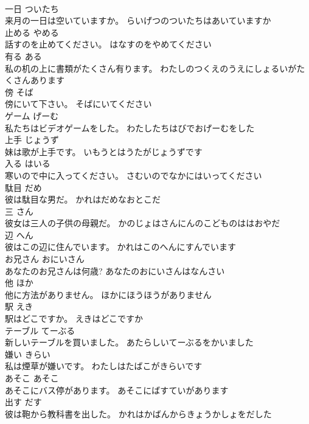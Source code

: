 \documentclass[8pt]{extreport}
\begin{document}
\begin{CJK}{UTF8}{min}
\\	一日	ついたち	
\\	来月の一日は空いていますか。	らいげつのついたちはあいていますか	
\\	止める	やめる	
\\	話すのを止めてください。	はなすのをやめてください	
\\	有る	ある	
\\	私の机の上に書類がたくさん有ります。	わたしのつくえのうえにしょるいがたくさんあります	
\\	傍	そば	
\\	傍にいて下さい。	そばにいてください	
\\	ゲーム	げーむ	
\\	私たちはビデオゲームをした。	わたしたちはびでおげーむをした	
\\	上手	じょうず	
\\	妹は歌が上手です。	いもうとはうたがじょうずです	
\\	入る	はいる	
\\	寒いので中に入ってください。	さむいのでなかにはいってください	
\\	駄目	だめ	
\\	彼は駄目な男だ。	かれはだめなおとこだ	
\\	三	さん	
\\	彼女は三人の子供の母親だ。	かのじょはさんにんのこどものははおやだ	
\\	辺	へん	
\\	彼はこの辺に住んでいます。	かれはこのへんにすんでいます	
\\	お兄さん	おにいさん	
\\	あなたのお兄さんは何歳?	あなたのおにいさんはなんさい	
\\	他	ほか	
\\	他に方法がありません。	ほかにほうほうがありません	
\\	駅	えき	
\\	駅はどこですか。	えきはどこですか	
\\	テーブル	てーぶる	
\\	新しいテーブルを買いました。	あたらしいてーぶるをかいました	
\\	嫌い	きらい	
\\	私は煙草が嫌いです。	わたしはたばこがきらいです	
\\	あそこ	あそこ	
\\	あそこにバス停があります。	あそこにばすていがあります	
\\	出す	だす	
\\	彼は鞄から教科書を出した。	かれはかばんからきょうかしょをだした	

\end{CJK}
\end{document}
